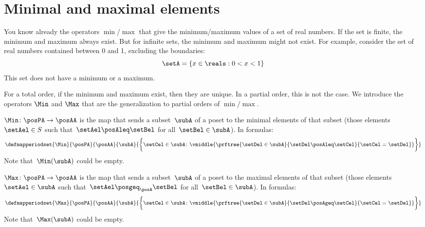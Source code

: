 \section{Minimal and maximal elements}

You know already the operators $\min$/$\max$ that give the minimum/maximum values of a set of real numbers. 
If the set is finite, the minimum and maximum always exist. But for infinite sets, the minimum and maximum might not exist. For example, consider the set of real numbers contained between 0 and 1, excluding the boundaries:
\begin{equation}
    \setA = \{ x \in \reals  : 0 < x < 1 \}
\end{equation}
This set does not have a minimum or a maximum. 

For a total order, if the minimum and maximum exist, then they are unique. 
In a partial order, this is not the case. 
We introduce the operators $\Min$ and $\Max$ that are the generalization to partial orders of $\min/\max$.




\begin{ctdefinition}
    \label{def:Min}
    $\Min \colon \posPA \to \posAA$ is the map that sends a subset~$\subA$ of a poset to the minimal elements of that subset (those elements~$\setAel \in S$ such that~$\setAel \posAleq \setBel$ for all~$\setBel \in \subA$).
    In formulas:
    \begin{equation*}
        \defmapperiodset{\Min}{\posPA}{\posAA}{\subA}{\bigg\{
            \setCel\in \subA\colon
            \vmiddle{
                \prftree{
                    \setDel\in \subA
                }{
                    \setDel\posAleq \setCel
                }{
                    \setCel=\setDel
                }
            }
            \bigg\}}
    \end{equation*}
    Note that~$\Min(\subA)$ could be empty.
\end{ctdefinition}

\begin{ctdefinition}
    \label{def:Max}
    $\Max \colon \posPA \to \posAA$ is the map that sends a subset~$\subA$ of a poset to the maximal elements of that subset (those elements~$\setAel \in \subA$ such that~$\setAel \posgeq_\posA \setBel$ for all~$\setBel \in \subA$).
    In formulas:
    \begin{equation*}
        \defmapperiodset{
            \Max
        }{
            \posPA
        }{
            \posAA
        }{
            \subA
        }{
            \bigg\{
            \setCel\in \subA\colon
            \vmiddle{
                \prftree{
                    \setDel\in \subA
                }{
                    \setDel\posAgeq \setCel
                }{
                    \setCel=\setDel
                }
            }
            \bigg\}
        }
    \end{equation*}
    Note that~$\Max(\subA)$ could be empty.
\end{ctdefinition}

